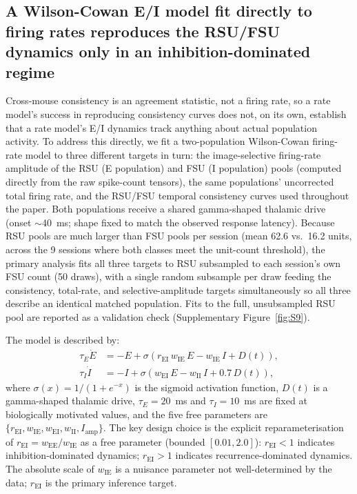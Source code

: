 \documentclass[11pt,onecolumn]{article}
\begin{document}
\subsection{A Wilson-Cowan E/I model fit directly to firing rates
reproduces the RSU/FSU dynamics only in an inhibition-dominated regime}

Cross-mouse consistency is an agreement statistic, not a firing rate, so
a rate model's success in reproducing consistency curves does not, on its
own, establish that a rate model's E/I dynamics track anything about
actual population activity.  To address this directly, we fit a
two-population Wilson-Cowan firing-rate model \citep{wilson1972} to
three different targets in turn: the image-selective firing-rate
amplitude of the RSU (E population) and FSU (I population) pools
(computed directly from the raw spike-count tensors), the same
populations' uncorrected total firing rate, and the RSU/FSU temporal
consistency curves used throughout the paper.  Both populations receive a
shared gamma-shaped thalamic drive (onset $\sim$40~ms; shape fixed to
match the observed response latency).  Because RSU pools are much larger
than FSU pools per session (mean 62.6 vs.\ 16.2 units, across the 9
sessions where both classes meet the unit-count threshold), the primary
analysis fits all three targets to RSU subsampled to each session's own
FSU count (50 draws), with a single random subsample per
draw feeding the consistency, total-rate, and selective-amplitude targets
simultaneously so all three describe an identical matched population.
Fits to the full, unsubsampled RSU pool are reported as a validation
check (Supplementary Figure~\ref{fig:S9}).

The model is described by:
\begin{align}
  \tau_E \dot{E} &= -E + \sigma\!\left(r_\mathrm{EI}\, w_\mathrm{IE}\, E
    - w_\mathrm{IE}\, I + D(t)\right), \label{eq:E} \\
  \tau_I \dot{I} &= -I + \sigma\!\left(w_\mathrm{EI}\, E
    - w_\mathrm{II}\, I + 0.7\, D(t)\right), \label{eq:I}
\end{align}
where $\sigma(x) = 1/(1 + e^{-x})$ is the sigmoid activation function,
$D(t)$ is a gamma-shaped thalamic drive, $\tau_E = 20$~ms and
$\tau_I = 10$~ms are fixed at biologically motivated values, and the
five free parameters are
$\{r_\mathrm{EI}, w_\mathrm{IE}, w_\mathrm{EI}, w_\mathrm{II},
I_\mathrm{amp}\}$.  The key design choice is the explicit
reparameterisation of $r_\mathrm{EI} = w_\mathrm{EE}/w_\mathrm{IE}$ as
a free parameter (bounded $[0.01, 2.0]$): $r_\mathrm{EI} < 1$ indicates
inhibition-dominated dynamics; $r_\mathrm{EI} > 1$ indicates
recurrence-dominated dynamics.  The absolute scale of $w_\mathrm{IE}$
is a nuisance parameter not well-determined by the data; $r_\mathrm{EI}$
is the primary inference target.
\end{document}
